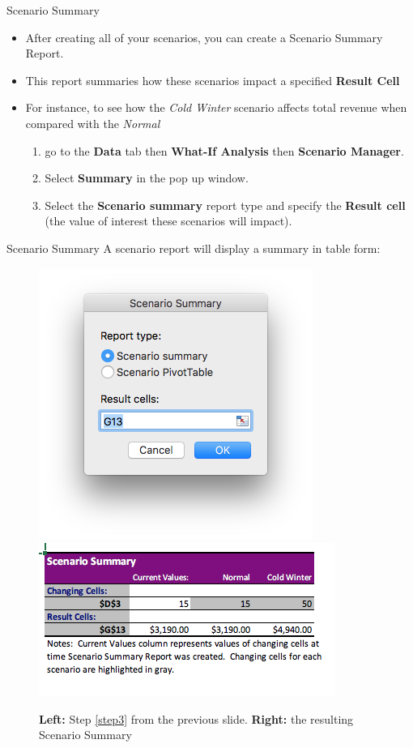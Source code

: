 \documentclass[xcolor=svgnames, handout]{beamer}
\begin{document}
\begin{frame}{Scenario Summary}
\begin{itemize}
\item After creating all of your scenarios, you can create a Scenario Summary Report.
\medskip
\item This report summaries how these scenarios impact a specified {\bf Result Cell}
\medskip
\item For instance, to see how the \textit{Cold Winter} scenario affects total revenue when compared with the \textit{Normal}
\begin{enumerate}
\item go to the {\bf Data} tab then {\bf What-If Analysis} then {\bf Scenario Manager}.  
\item Select {\bf Summary} in the pop up window. 
\item  Select the {\bf Scenario summary} report type and specify the {\bf Result cell} (the value of interest these scenarios will impact). \label{step3}
\end{enumerate}
\end{itemize}
\end{frame}


\begin{frame}{Scenario Summary}
A scenario report will display a summary in table form:
\begin{figure}[htbp]
\begin{center}
\includegraphics[height=0.4\textwidth]{scwin}
\includegraphics[height=0.3\textwidth]{scsum}
\caption{{\bf Left:} Step \ref{step3} from the previous slide. {\bf Right:} the resulting Scenario Summary  }
\label{default}
\end{center}
\end{figure}

\end{frame}
\end{document}
